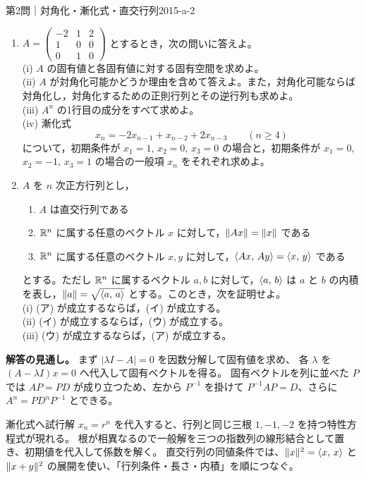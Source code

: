 \begin{problem}{第2問｜対角化・漸化式・直交行列}{2015-a-2}
\begin{enumerate}
  \item[(1)] $A=\begin{pmatrix}-2&1&2\\1&0&0\\0&1&0\end{pmatrix}$ とするとき，次の問いに答えよ。\\
  (i) $A$ の固有値と各固有値に対する固有空間を求めよ。\\
  (ii) $A$ が対角化可能かどうか理由を含めて答えよ。また，対角化可能ならば対角化し，対角化するための正則行列とその逆行列も求めよ。\\
  (iii) $A^n$ の1行目の成分をすべて求めよ。\\
  (iv) 漸化式
  \[
  x_n=-2x_{n-1}+x_{n-2}+2x_{n-3}\qquad(n\ge4)
  \]
  について，初期条件が $x_1=1$, $x_2=0$, $x_3=0$ の場合と，初期条件が $x_1=0$, $x_2=-1$, $x_3=1$ の場合の一般項 $x_n$ をそれぞれ求めよ。
  \item[(2)] $A$ を $n$ 次正方行列とし，
  \begin{enumerate}
    \item[(ア)] $A$ は直交行列である
    \item[(イ)] $\mathbb{R}^n$ に属する任意のベクトル $x$ に対して，$\lVert Ax \rVert=\lVert x \rVert$ である
    \item[(ウ)] $\mathbb{R}^n$ に属する任意のベクトル $x,y$ に対して，$\langle Ax,\, Ay \rangle=\langle x,\, y \rangle$ である
  \end{enumerate}
  とする。ただし $\mathbb{R}^n$ に属するベクトル $a,b$ に対して，$\langle a,\, b \rangle$ は $a$ と $b$ の内積を表し，$\lVert a \rVert=\sqrt{\langle a,\, a \rangle}$ とする。このとき，次を証明せよ。\\
  (i) (ア) が成立するならば，(イ) が成立する。\\
  (ii) (イ) が成立するならば，(ウ) が成立する。\\
  (iii) (ウ) が成立するならば，(ア) が成立する。
\end{enumerate}
\end{problem}
\begin{memo*}
\textbf{解答の見通し。}
まず $|\lambda I-A|=0$ を因数分解して固有値を求め、
各 $\lambda$ を $(A-\lambda I)x=0$ へ代入して固有ベクトルを得る。
固有ベクトルを列に並べた $P$ では $AP=PD$ が成り立つため、左から $P^{-1}$ を掛けて
$P^{-1}AP=D$、さらに $A^n=PD^nP^{-1}$ とできる。

漸化式へ試行解 $x_n=r^n$ を代入すると、行列と同じ三根 $1,-1,-2$ を持つ特性方程式が現れる。
根が相異なるので一般解を三つの指数列の線形結合として置き、初期値を代入して係数を解く。
直交行列の同値条件では、$\lVert x \rVert^2=\langle x,\, x \rangle$ と
$\lVert x+y \rVert^2$ の展開を使い、「行列条件・長さ・内積」を順につなぐ。
\end{memo*}
